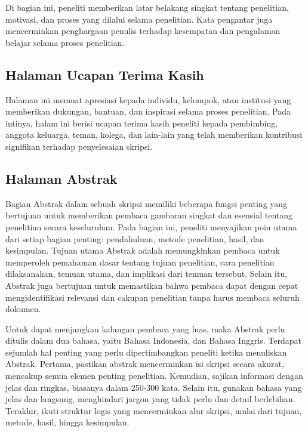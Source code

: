 \documentclass[
  indonesian,
  letterpaper,
]{scrbook}
\begin{document}
Di bagian ini, peneliti memberikan latar belakang singkat tentang
penelitian, motivasi, dan proses yang dilalui selama penelitian. Kata
pengantar juga mencerminkan penghargaan penulis terhadap kesempatan dan
pengalaman belajar selama proses penelitian.

\subsection{Halaman Ucapan Terima
Kasih}\label{halaman-ucapan-terima-kasih}

Halaman ini memuat apresiasi kepada individu, kelompok, atau institusi
yang memberikan dukungan, bantuan, dan inspirasi selama proses
penelitian. Pada intinya, halam ini berisi ucapan terima kasih peneliti
kepada pembimbing, anggota keluarga, teman, kolega, dan lain-lain yang
telah memberikan kontribusi signifikan terhadap penyelesaian skripsi.

\subsection{Halaman Abstrak}\label{halaman-abstrak}

Bagian Abstrak dalam sebuah skripsi memiliki beberapa fungsi penting
yang bertujuan untuk memberikan pembaca gambaran singkat dan esensial
tentang penelitian secara keseluruhan. Pada bagian ini, peneliti
menyajikan poin utama dari setiap bagian penting: pendahuluan, metode
penelitian, hasil, dan kesimpulan. Tujuan utama Abstrak adalah
memungkinkan pembaca untuk memperoleh pemahaman dasar tentang tujuan
penelitian, cara penelitian dilaksanakan, temuan utama, dan implikasi
dari temuan tersebut. Selain itu, Abstrak juga bertujuan untuk
memastikan bahwa pembaca dapat dengan cepat mengidentifikasi relevansi
dan cakupan penelitian tanpa harus membaca seluruh dokumen.

Untuk dapat menjangkau kalangan pembaca yang luas, maka Abstrak perlu
ditulis dalam dua bahasa, yaitu Bahasa Indonesia, dan Bahasa Inggris.
Terdapat sejumlah hal penting yang perlu dipertimbangkan peneliti ketika
menuliskan Abstrak. Pertama, pastikan abstrak mencerminkan isi skripsi
secara akurat, mencakup semua elemen penting penelitian. Kemudian,
sajikan informasi dengan jelas dan ringkas, biasanya dalam 250-300 kata.
Selain itu, gunakan bahasa yang jelas dan langsung, menghindari jargon
yang tidak perlu dan detail berlebihan. Terakhir, ikuti struktur logis
yang mencerminkan alur skripsi, mulai dari tujuan, metode, hasil, hingga
kesimpulan.
\end{document}
